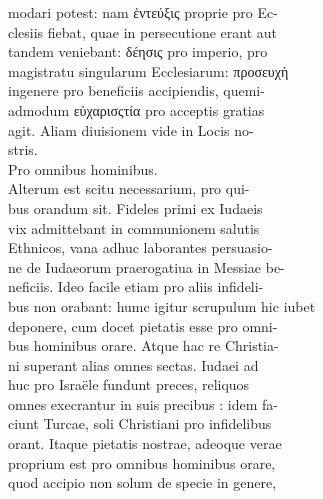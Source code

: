 \documentclass{article}
\begin{document}
\begin{pages}
                modari potest: nam ἐντεύξις proprie pro Ec- \\
                clesiis fiebat, quae in persecutione erant aut \\
                tandem veniebant: δέησις pro imperio, pro \\
                magistratu singularum Ecclesiarum: προσευχὴ \\
                ingenere pro beneficiis accipiendis, quemi- \\
                admodum εὐχαρισςτία pro acceptis gratias \\
                agit. Aliam diuisionem vide in Locis no- \\
                stris. \\
                Pro omnibus hominibus. \\
                Alterum est scitu necessarium, pro qui- \\
                bus orandum sit. Fideles primi ex Iudaeis \\
                vix admittebant in communionem salutis \\
                Ethnicos, vana adhuc laborantes persuasio- \\
                ne de Iudaeorum praerogatiua in Messiae be- \\
                neficiis. Ideo facile etiam pro aliis infideli- \\
                bus non orabant: humc igitur scrupulum hic iubet \\
                deponere, cum docet pietatis esse pro omni- \\
                bus hominibus orare. Atque hac re Christia- \\
                ni superant alias omnes sectas. Iudaei ad \\
                huc pro Israële fundunt preces, reliquos \\
                omnes execrantur in suis precibus : idem fa- \\
                ciunt Turcae, soli Christiani pro infidelibus \\
                orant. Itaque pietatis nostrae, adeoque verae \\
                proprium est pro omnibus hominibus orare, \\
                quod accipio non solum de specie in genere, \\

\end{pages}
\end{document}
